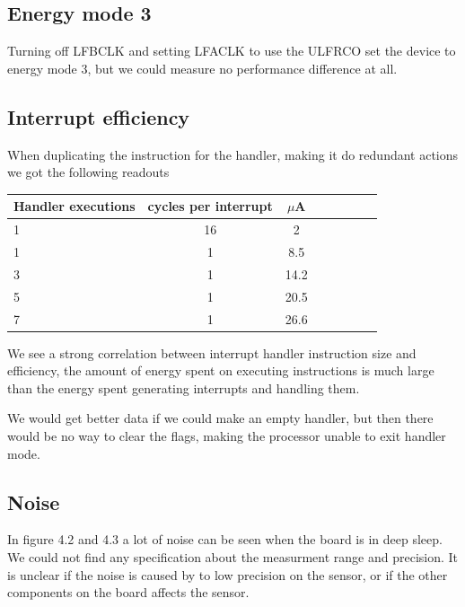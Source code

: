\subsection{Energy mode 3}
Turning off LFBCLK and setting LFACLK to use the ULFRCO set the device to energy mode 3, but we could measure no performance difference at all.

\subsection{Interrupt efficiency}
When duplicating the instruction for the handler, making it do redundant actions we got the following readouts 

\begin{tabular}{l*{6}{c}r}
Handler executions & cycles per interrupt & $\mu$A \\
\hline
1 & 16 & 2  \\
1 & 1 & 8.5  \\
3 & 1 & 14.2  \\
5 & 1 & 20.5  \\
7 & 1 & 26.6  \\
\end{tabular}

We see a strong correlation between interrupt handler instruction size and efficiency, the amount of energy spent on executing instructions is much large than the energy spent generating interrupts and handling them.

We would get better data if we could make an empty handler, but then there would be no way to clear the flags, making the processor unable to exit handler mode.

\subsection{Noise}
In figure 4.2 and 4.3 a lot of noise can be seen when the board is in deep sleep. We could not find any specification about the measurment range and precision. It is unclear if the noise is caused by to low precision on the sensor, or if the other components on the board affects the sensor.